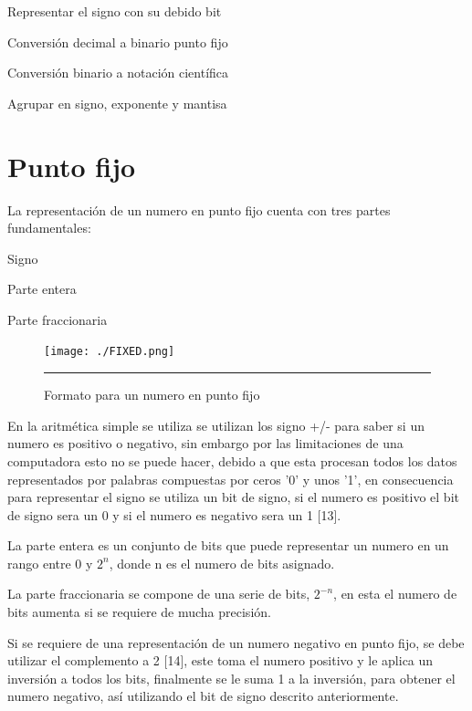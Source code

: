 \begin{compactitem}
\item Representar el signo con su debido bit
\item Conversión decimal a binario punto fijo   
\item Conversión binario a notación científica
\item Agrupar en signo, exponente y mantisa 
\end{compactitem}


\section{Punto fijo}
 
La representación de un numero en punto fijo cuenta con tres partes fundamentales:
\begin{compactitem}
\item Signo
\item Parte entera   
\item Parte fraccionaria 
\end{compactitem}

\begin{figure}[H]
  \centering
    \texttt{[image: ./FIXED.png]}
    \rule{35em}{0.5pt}
  \caption[Formato para un numero en punto fijo]{Formato para un numero en punto fijo}
  \label{fig:FIXED}
\end{figure}

En la aritmética simple se utiliza se utilizan los signo +/- para saber si un numero es positivo o negativo, sin embargo por las limitaciones de una computadora esto no se puede hacer, debido a que esta procesan todos los datos representados por palabras compuestas por ceros '0' y unos '1', en consecuencia para representar el signo se utiliza un bit de signo, si el numero es positivo el bit de signo sera un 0 y si el numero es negativo sera un 1 [13]. 

La parte entera es un conjunto de bits que puede representar un numero en un rango entre 0 y $ 2^n $, donde n es el numero de bits asignado. 

La parte fraccionaria se compone de una serie de bits, $ 2^{-n} $, en esta el numero de bits aumenta si se requiere de mucha precisión. 

Si se requiere de una representación de un numero negativo en punto fijo, se debe utilizar el complemento a 2 [14], este toma el numero positivo y le aplica un inversión a todos los bits, finalmente se le suma 1 a la inversión, para obtener el numero negativo, así utilizando el bit de signo descrito anteriormente. 
 
  